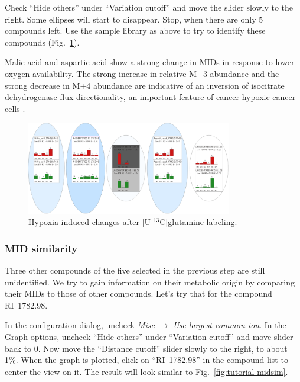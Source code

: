 \documentclass[a4paper,12pt]{scrartcl}
\begin{document}

Check ``Hide others'' under ``Variation cutoff'' and move the slider slowly to the right. Some ellipses will start to disappear. Stop, when there are only 5 compounds left. Use the sample library as above to try to identify these compounds (Fig.~\ref{fig:tutorial-highvar}).

Malic acid and aspartic acid show a strong change in MIDs in response to lower oxygen availability. The strong increase in relative M+3 abundance and the strong decrease in M+4 abundance are indicative of an inversion of isocitrate dehydrogenase flux directionality, an important feature of cancer hypoxic cancer cells \citep{Wise2008,Metallo2012,Weindl2016}.

\begin{figure}[htbp]
 \centering
 \includegraphics[width=0.8\textwidth]{./gfx/ss_tutorial_highvar.png}
 \caption{Hypoxia-induced changes after [U-$^{13}$C]glutamine labeling.}
 \label{fig:tutorial-highvar}
\end{figure}

\subsubsection{MID similarity}

Three other compounds of the five selected in the previous step are still unidentified. We try to gain information on their metabolic origin by comparing their MIDs to those of other compounds. Let's try that for the compound RI~1782.98.

In the configuration dialog, uncheck \textit{Misc} $\rightarrow$ \textit{Use largest common ion}. In the Graph options, uncheck ``Hide others'' under ``Variation cutoff'' and move slider back to 0. Now move the ``Distance cutoff'' slider slowly to the right, to about 1\%.
When the graph is plotted, click on ``RI~1782.98'' in the compound list to center the view on it. The result will look similar to Fig.~\ref{fig:tutorial-midsim}.
\end{document}
